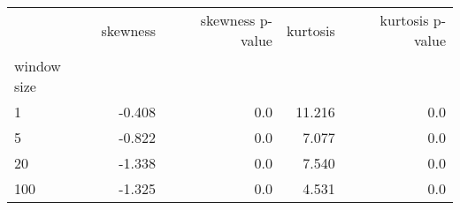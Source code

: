\begin{tabular}{lrrrr}
\toprule
{} &  skewness &  skewness p-value &  kurtosis &  kurtosis p-value \\
window size &           &                   &           &                   \\
\midrule
1           &    -0.408 &               0.0 &    11.216 &               0.0 \\
5           &    -0.822 &               0.0 &     7.077 &               0.0 \\
20          &    -1.338 &               0.0 &     7.540 &               0.0 \\
100         &    -1.325 &               0.0 &     4.531 &               0.0 \\
\bottomrule
\end{tabular}
